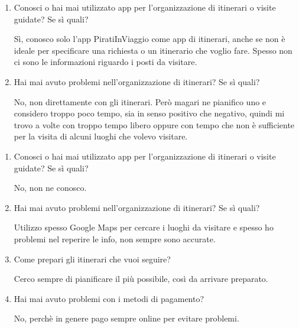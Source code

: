 \clearpage
{}

\begin{enumerate}

\item Conosci o hai mai utilizzato app per l'organizzazione di itinerari o visite guidate? Se sì quali?

Sì, conosco solo l'app PiratiInViaggio come app di itinerari, anche se non è ideale per specificare una richiesta o un itinerario che voglio fare. Spesso non ci sono le informazioni riguardo i posti da visitare. 

\item Hai mai avuto problemi nell'organizzazione di itinerari? Se sì quali?

No, non direttamente con gli itinerari. Però magari ne pianifico uno e considero troppo poco tempo, sia in senso positivo che negativo, quindi mi trovo a volte con troppo tempo libero oppure con tempo che non è sufficiente per la visita di alcuni luoghi che volevo visitare.

\end{enumerate}

\clearpage
{}

\begin{enumerate}

\item Conosci o hai mai utilizzato app per l'organizzazione di itinerari o visite guidate? Se sì quali?

No, non ne conosco.

\item Hai mai avuto problemi nell'organizzazione di itinerari? Se sì quali?

Utilizzo spesso Google Maps per cercare i luoghi da visitare e spesso ho problemi nel reperire le info, non sempre sono accurate.

\item Come prepari gli itinerari che vuoi seguire?

Cerco sempre di pianificare il più possibile, così da arrivare preparato.

\item Hai mai avuto problemi con i metodi di pagamento?

No, perchè in genere pago sempre online per evitare problemi.

\end{enumerate}

\clearpage
{}

